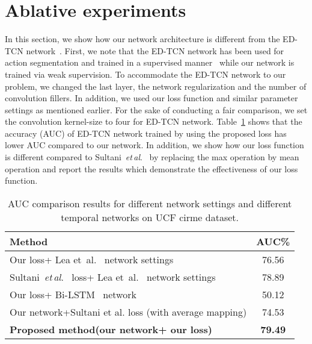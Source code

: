 \documentclass[journal]{IEEEtran}
\newcommand{\authorcite}{{\textit{et}\,\textit{al}.}}
\begin{document}
\section{Ablative experiments}
In this section, we show how our network architecture is different from the ED-TCN network~\cite{lea2017temporal}. First, we note that the ED-TCN network has been used for action segmentation and trained in a supervised manner~\cite{lea2017temporal} while our network is trained via weak supervision. To accommodate the ED-TCN network to our problem, we changed the last layer, the network regularization and the number of convolution fillers. In addition, we used our loss function and similar parameter settings as mentioned earlier. For the sake of conducting a fair comparison, we set the convolution kernel-size to four for ED-TCN network. Table~\ref{ablative_table} shows that the accuracy (AUC) of ED-TCN network trained by using the proposed loss has lower AUC compared to our network. In addition, we show how our loss function is different compared to Sultani~\authorcite~\cite{sultani2018real} by replacing the max operation by mean operation and report the results which demonstrate the effectiveness of our loss function. 
\begin{table}[t]
	\centering
	\caption{AUC comparison results for different network settings and different temporal networks on UCF cirme dataset.}	
\begin{tabular}[t]{lc}
		\toprule
		Method & AUC\%\\
		\midrule
		Our loss+ Lea et~al.~\cite{lea2017temporal} network settings & 76.56\\
		Sultani~\authorcite~\cite{sultani2018real} loss+ Lea et~al.~\cite{lea2017temporal} network settings & 78.89 \\ Our loss+ Bi-LSTM~\cite{graves2005bidirectional} network & 50.12\\
		Our network+Sultani et al. loss (with average mapping) &74.53\\
\midrule
		\textbf{Proposed method(our network+ our loss)} & \textbf{79.49}\\
		\bottomrule
	\end{tabular}
	\label{ablative_table}
\end{table}
\end{document}
